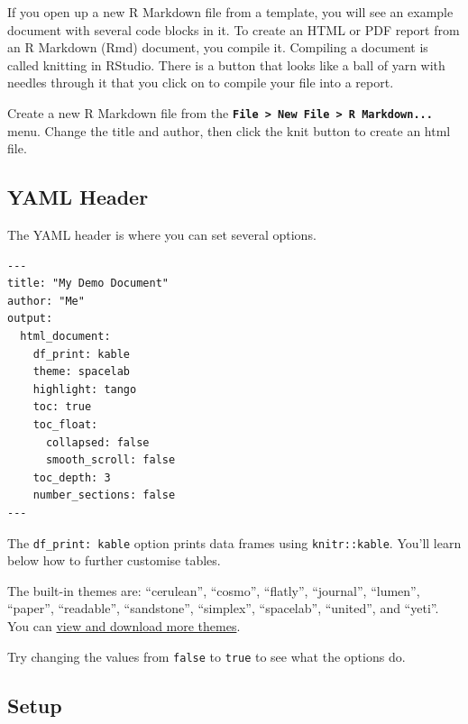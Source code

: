 \documentclass[
  oneside]{book}
\begin{document}
If you open up a new R Markdown file from a template, you will see an example document with several code blocks in it. To create an HTML or PDF report from an R Markdown (Rmd) document, you compile it. Compiling a document is called knitting in RStudio. There is a button that looks like a ball of yarn with needles through it that you click on to compile your file into a report.

\begin{try}
Create a new R Markdown file from the \textbf{\texttt{File\ \textgreater{}\ New\ File\ \textgreater{}\ R\ Markdown...}} menu. Change the title and author, then click the knit button to create an html file.

\end{try}

\hypertarget{yaml-header}{%
\subsection{YAML Header}\label{yaml-header}}

The YAML header is where you can set several options.

\begin{verbatim}
---
title: "My Demo Document"
author: "Me"
output:
  html_document:
    df_print: kable
    theme: spacelab
    highlight: tango
    toc: true
    toc_float:
      collapsed: false
      smooth_scroll: false
    toc_depth: 3
    number_sections: false
---
\end{verbatim}

The \texttt{df\_print:\ kable} option prints data frames using \texttt{knitr::kable}. You'll learn below how to further customise tables.

The built-in themes are: ``cerulean'', ``cosmo'', ``flatly'', ``journal'', ``lumen'', ``paper'', ``readable'', ``sandstone'', ``simplex'', ``spacelab'', ``united'', and ``yeti''. You can \href{http://www.datadreaming.org/post/r-markdown-theme-gallery/}{view and download more themes}.

\begin{info}
Try changing the values from \texttt{false} to \texttt{true} to see what the options do.

\end{info}

\hypertarget{setup}{%
\subsection{Setup}\label{setup}}
\end{document}
